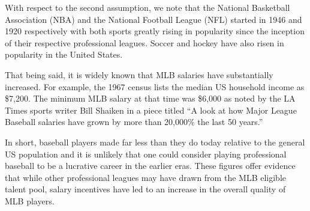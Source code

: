 \documentclass[11pt]{article}\usepackage[]{graphicx}\usepackage[]{color}
\begin{document}
With respect to the second assumption, we note that the 
National Basketball Association (NBA) and the National Football League (NFL) 
started in 1946 and 1920 respectively %
with both sports greatly rising in popularity since the inception of their 
respective professional leagues.  Soccer and hockey have also risen in 
popularity in the United States.  

That being said, it is widely known that 
MLB salaries have substantially increased.
For example, the 1967 census lists the median US household income as \$7,200. 
The minimum MLB salary at that time was \$6,000 as noted by the LA Times 
sports writer Bill Shaiken in a piece titled ``A look at how Major League 
Baseball salaries have grown by more than 20,000\% the last 50 years.''

In short,
baseball players made far less than they do today relative to the general US 
population and it is unlikely that one could consider playing professional 
baseball to be a lucrative career in the earlier eras. 
These figures offer evidence that while other 
professional leagues may have drawn from the MLB eligible talent pool, 
salary incentives have led to an increase in the overall quality of MLB 
players.  %
\end{document}
